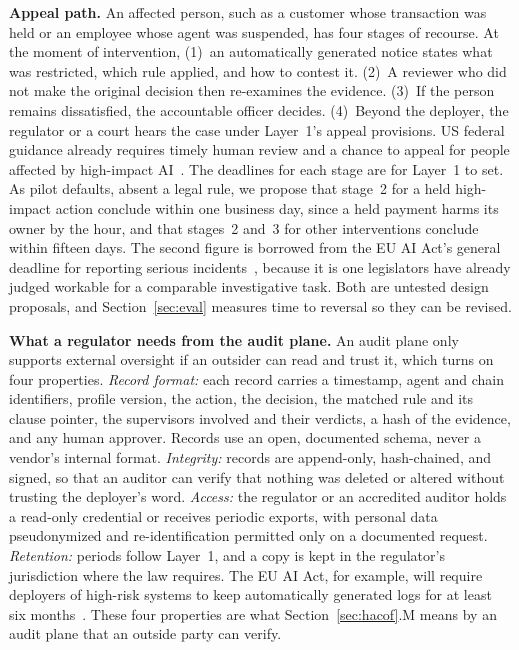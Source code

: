 \documentclass{ieeeaccess}
\begin{document}
\textbf{Appeal path.} An affected person, such as a customer whose transaction was held or an employee whose agent was suspended, has four stages of recourse. At the moment of intervention, (1)~an automatically generated notice states what was restricted, which rule applied, and how to contest it. (2)~A reviewer who did not make the original decision then re-examines the evidence. (3)~If the person remains dissatisfied, the accountable officer decides. (4)~Beyond the deployer, the regulator or a court hears the case under Layer~1's appeal provisions. US federal guidance already requires timely human review and a chance to appeal for people affected by high-impact AI~\cite{omb2025m2521}.
The deadlines for each stage are for Layer~1 to set. As pilot defaults, absent a legal rule, we propose that stage~2 for a held high-impact action conclude within one business day, since a held payment harms its owner by the hour, and that stages~2 and~3 for other interventions conclude within fifteen days. The second figure is borrowed from the EU AI Act's general deadline for reporting serious incidents~\cite{euaiact2024},
because it is one legislators have already judged workable for a comparable investigative task. Both are untested design proposals, and Section~\ref{sec:eval} measures time to reversal so they can be revised.

\textbf{What a regulator needs from the audit plane.} An audit plane only supports external oversight if an outsider can read and trust it, which turns on four properties. \textit{Record format:} each record carries a timestamp, agent and chain identifiers, profile version, the action, the decision, the matched rule and its clause pointer, the supervisors involved and their verdicts, a hash of the evidence, and any human approver. Records use an open, documented schema, never a vendor's internal format. \textit{Integrity:} records are append-only, hash-chained, and signed, so that an auditor can verify that nothing was deleted or altered without trusting the deployer's word. \textit{Access:} the regulator or an accredited auditor holds a read-only credential or receives periodic exports, with personal data pseudonymized and re-identification permitted only on a documented request. \textit{Retention:} periods follow Layer~1, and a copy is kept in the regulator's jurisdiction where the law requires. The EU AI Act, for example, will require deployers of high-risk systems to keep automatically generated logs for at least six months~\cite{euaiact2024,euaiomnibus2026}.
These four properties are what Section~\ref{sec:hacof}.M means by an audit plane that an outside party can verify.
\end{document}
